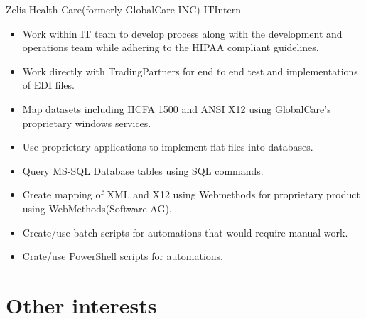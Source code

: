 \documentclass[letterpaper]{twentysecondcv} %
\begin{document}
{} %
{Zelis Health Care(formerly GlobalCare INC)} %
{ITIntern} %
{} %
\begin{itemize}
		\setlength \itemsep{0em}	
		\item Work within IT team to develop process along with the development and operations team while adhering to the HIPAA compliant guidelines.
		\item Work directly with TradingPartners for end to end test and implementations of EDI files.
		\item Map datasets including HCFA 1500 and ANSI X12 using GlobalCare’s proprietary windows services.
		\item Use proprietary applications to implement flat files into databases.
		\item Query MS-SQL Database tables using SQL commands.
		\item Create mapping of XML and X12 using Webmethods for proprietary product using WebMethods(Software AG).
		\item Create/use batch scripts for automations that would require manual work.
		\item Crate/use PowerShell scripts for automations. 
\end{itemize}



\section{Other interests}

\textsc{\Large\icon{\faDumbbell}}
\textsc{\Large\icon{\faGamepad}}
\textsc{\Large\icon{\faCoffee}}
\textsc{\Large\icon{\faCutlery}}
\textsc{\Large\icon{\faPaw}}
\textsc{\Large\icon{\faCar}}
\textsc{\Large\icon{\faMusic}}
\textsc{\Large\icon{\faTools}}
\end{document}
